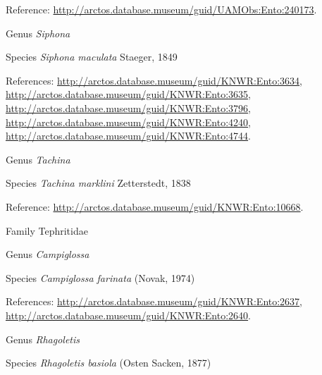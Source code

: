 \documentclass[9pt, article]{memoir}
\begin{document}
\begin{multicols}{2}
\vspace{6pt}Reference: 
\url{http://arctos.database.museum/guid/UAMObs:Ento:240173}.

\vspace{6pt}\noindent\hspace{30pt}Genus \textit{Siphona}


\vspace{6pt}\noindent\hspace{36pt}Species \textit{Siphona maculata} Staeger, 1849


\vspace{6pt}References: 
\url{http://arctos.database.museum/guid/KNWR:Ento:3634}, 
\url{http://arctos.database.museum/guid/KNWR:Ento:3635}, 
\url{http://arctos.database.museum/guid/KNWR:Ento:3796}, 
\url{http://arctos.database.museum/guid/KNWR:Ento:4240}, 
\url{http://arctos.database.museum/guid/KNWR:Ento:4744}.

\vspace{6pt}\noindent\hspace{30pt}Genus \textit{Tachina}


\vspace{6pt}\noindent\hspace{36pt}Species \textit{Tachina marklini} Zetterstedt, 1838


\vspace{6pt}Reference: 
\url{http://arctos.database.museum/guid/KNWR:Ento:10668}.

\vspace{6pt}\noindent\hspace{24pt}Family Tephritidae


\vspace{6pt}\noindent\hspace{30pt}Genus \textit{Campiglossa}


\vspace{6pt}\noindent\hspace{36pt}Species \textit{Campiglossa farinata} (Novak, 1974)


\vspace{6pt}References: 
\url{http://arctos.database.museum/guid/KNWR:Ento:2637}, 
\url{http://arctos.database.museum/guid/KNWR:Ento:2640}.

\vspace{6pt}\noindent\hspace{30pt}Genus \textit{Rhagoletis}


\vspace{6pt}\noindent\hspace{36pt}Species \textit{Rhagoletis basiola} (Osten Sacken, 1877)



\end{multicols}
\end{document}
